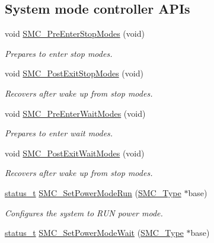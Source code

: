 \subsection*{System mode controller A\+P\+Is}
\begin{DoxyCompactItemize}
\item 
void \mbox{\hyperlink{group__smc_ga4e3f84838f007e3b5939838dafd0a7f9}{S\+M\+C\+\_\+\+Pre\+Enter\+Stop\+Modes}} (void)
\begin{DoxyCompactList}\small\item\em Prepares to enter stop modes. \end{DoxyCompactList}\item 
void \mbox{\hyperlink{group__smc_ga2ce7e977d78cbc1c355aea3b7acb1b4e}{S\+M\+C\+\_\+\+Post\+Exit\+Stop\+Modes}} (void)
\begin{DoxyCompactList}\small\item\em Recovers after wake up from stop modes. \end{DoxyCompactList}\item 
void \mbox{\hyperlink{group__smc_ga3e21b9caeb6f72076f1ba5fa839c4410}{S\+M\+C\+\_\+\+Pre\+Enter\+Wait\+Modes}} (void)
\begin{DoxyCompactList}\small\item\em Prepares to enter wait modes. \end{DoxyCompactList}\item 
void \mbox{\hyperlink{group__smc_gad91c84fedf08f14580c4c86b52bc52d2}{S\+M\+C\+\_\+\+Post\+Exit\+Wait\+Modes}} (void)
\begin{DoxyCompactList}\small\item\em Recovers after wake up from stop modes. \end{DoxyCompactList}\item 
\mbox{\hyperlink{group__ksdk__common_gaaabdaf7ee58ca7269bd4bf24efcde092}{status\+\_\+t}} \mbox{\hyperlink{group__smc_ga8f141beaa4867a3d1606b714e63c30c3}{S\+M\+C\+\_\+\+Set\+Power\+Mode\+Run}} (\mbox{\hyperlink{struct_s_m_c___type}{S\+M\+C\+\_\+\+Type}} $\ast$base)
\begin{DoxyCompactList}\small\item\em Configures the system to R\+UN power mode. \end{DoxyCompactList}\item 
\mbox{\hyperlink{group__ksdk__common_gaaabdaf7ee58ca7269bd4bf24efcde092}{status\+\_\+t}} \mbox{\hyperlink{group__smc_gaaf1664f2d4a78b756e5e30f5433af975}{S\+M\+C\+\_\+\+Set\+Power\+Mode\+Wait}} (\mbox{\hyperlink{struct_s_m_c___type}{S\+M\+C\+\_\+\+Type}} $\ast$base)

\end{DoxyCompactItemize}
